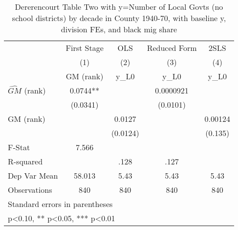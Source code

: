 \begin{table}[htbp]\centering
\def\sym#1{\ifmmode^{#1}\else\(^{#1}\)\fi}
\caption{Dererencourt Table Two with y=Number of Local Govts (no school districts) by decade in County 1940-70, with baseline y, division FEs, and black mig share}
\begin{tabular}{l*{4}{c}}
\toprule
                    & First Stage   &         OLS   &Reduced Form   &        2SLS   \\
                    &\multicolumn{1}{c}{(1)}&\multicolumn{1}{c}{(2)}&\multicolumn{1}{c}{(3)}&\multicolumn{1}{c}{(4)}\\
                    &\multicolumn{1}{c}{GM  (rank)}&\multicolumn{1}{c}{y\_L0}&\multicolumn{1}{c}{y\_L0}&\multicolumn{1}{c}{y\_L0}\\
\midrule
$\hat{GM}$ (rank)   &      0.0744** &               &   0.0000921   &               \\
                    &    (0.0341)   &               &    (0.0101)   &               \\
\addlinespace
GM  (rank)          &               &      0.0127   &               &     0.00124   \\
                    &               &    (0.0124)   &               &     (0.135)   \\
\midrule
F-Stat              &       7.566   &               &               &               \\
R-squared           &               &        .128   &        .127   &               \\
Dep Var Mean        &      58.013   &        5.43   &        5.43   &        5.43   \\
Observations        &         840   &         840   &         840   &         840   \\
\bottomrule
\multicolumn{5}{l}{\footnotesize Standard errors in parentheses}\\
\multicolumn{5}{l}{\footnotesize * p<0.10, ** p<0.05, *** p<0.01}\\
\end{tabular}
\end{table}
